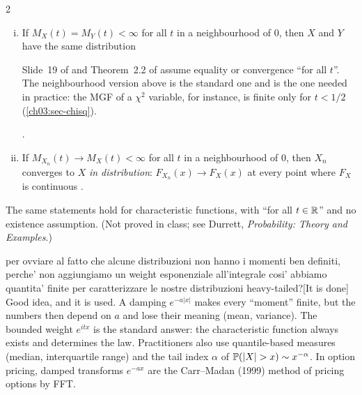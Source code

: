 \begin{paracol}{2}
\begin{theorem}\label{ch03:thm-mgf}
\leavevmode
\begin{enumerate}[(i)]
  \item If $M_X(t)=M_Y(t)<\infty$ for all $t$ in a neighbourhood of $0$, then $X$ and $Y$ have the same distribution\begin{coursenote}
Slide~19 of  and Theorem~2.2 of  assume equality or convergence ``for all $t$''.
The neighbourhood version above is the standard one and is the one needed in practice: the MGF of a
$\chi^2$ variable, for instance, is finite only for $t<1/2$ (\cref{ch03:sec-chisq}).
\end{coursenote}
        .
  \item If $M_{X_n}(t)\to M_X(t)<\infty$ for all $t$ in a neighbourhood of $0$, then $X_n$ converges to $X$ \emph{in
        distribution}: $F_{X_n}(x)\to F_X(x)$ at every point where $F_X$ is continuous .
\end{enumerate}
The same statements hold for characteristic functions, with ``for all $t\in\mathbb{R}$'' and no existence
assumption. (Not proved in class; see Durrett, \emph{Probability: Theory and Examples}.)
\end{theorem}
\begin{answer}{per ovviare al fatto che alcune distribuzioni non hanno i momenti ben definiti, perche' non aggiungiamo un weight esponenziale all'integrale cosi' abbiamo quantita' finite per caratterizzare le nostre distribuzioni heavy-tailed?}[It is done]
Good idea, and it is used. A damping $e^{-a|x|}$ makes every ``moment'' finite, but the numbers then
depend on $a$ and lose their meaning (mean, variance). The bounded weight $e^{itx}$ is the standard
answer: the characteristic function always exists and determines the law. Practitioners also use
quantile-based measures (median, interquartile range) and the tail index $\alpha$ of $\Prob(|X|>x)\sim x^{-\alpha}$.
In option pricing, damped transforms $e^{-ax}$ are the Carr--Madan (1999) method of pricing options by FFT.
\end{answer}


\end{paracol}
